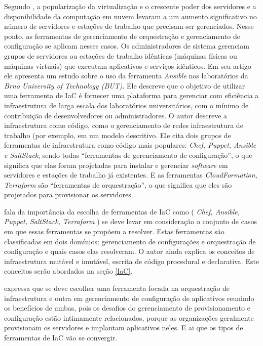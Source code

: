 Segundo , a popularização da virtualização e o crescente poder dos servidores e a disponibilidade da computação em nuvem levaram a um aumento significativo no número de servidores e estações de trabalho que precisam ser gerenciados. Nesse ponto, as ferramentas de gerenciamento de orquestração e gerenciamento de configuração se aplicam nesses casos. Os administradores de sistema gerenciam grupos de servidores ou estações de trabalho idênticas (máquinas físicas ou máquinas virtuais) que executam aplicativos e serviços idênticos. Em seu artigo ele apresenta um estudo sobre o uso da ferramenta \textit{Ansible} nos laboratórios da \textit{Brno University of Technology (BUT)}. Ele descreve que o objetivo de utilizar uma ferramenta de IaC é fornecer uma plataforma para gerenciar com eficiência a infraestrutura de larga escala dos laboratórios universitários, com o mínimo de contribuição de desenvolvedores ou administradores.
O autor descreve a infraestrutura como código, como o gerenciamento de redes infraestrutura de trabalho (por exemplo,  em um modelo descritivo. Ele cita dois grupos de ferramentas de infraestrutura como código mais populares: \textit{Chef, Puppet, Ansible e SaltStack}, sendo todas “ferramentas de gerenciamento de configuração”, o que significa que elas foram projetadas para instalar e gerenciar \textit{software} em servidores e estações de trabalho já existentes. E as ferramentas \textit{CloudFormation, Terraform} são “ferramentas de orquestração”, o que significa que eles são projetados para provisionar os servidores.

\hfill

  fala da importância da escolha de ferramentas de IaC como (\textit{ Chef, Ansible, Puppet, SaltStack, Terraform }) se deve levar em consideração o conjunto de casos em que essas ferramentas se propõem a resolver. Estas ferramentas são classificadas em dois domínios: gerenciamento de configurações e orquestração de configuração e quais casos elas resolveram. O autor ainda explica os conceitos de infraestrutura mutável e imutável, escrita de código procedural e declarativa. Este conceitos serão abordados na seção \ref{IaC}. 

 expressa que se deve escolher uma ferramenta focada na orquestração de infraestrutura e outra em gerenciamento de configuração de aplicativos reunindo os benefícios de ambas, pois os desafios do gerenciamento de provisionamento e configuração estão intimamente relacionados, porque as organizações geralmente provisionam os servidores e implantam aplicativos neles. E ai que os tipos de ferramentas de IaC vão se convergir.   

